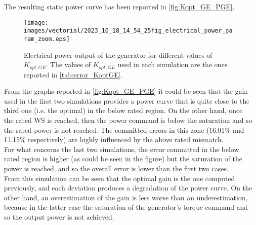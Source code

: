 The resulting static power curve has been reported in \autoref{fig:Kopt_GE_PGE}.
\begin{figure}
  \centering
  \texttt{[image: images/vectorial/2023\_10\_18\_14\_54\_25fig\_electrical\_power\_param\_zoom.eps]}
  \caption{Electrical power output of the generator for different values of $K_{opt,GE}$. The values of $K_{opt,GE}$ used in each simulation are the ones reported in \autoref{tab:error_KoptGE}.}
  \label{fig:Kopt_GE_PGE}
\end{figure}

From the graphs reported in \autoref{fig:Kopt_GE_PGE} it could be seen that the gain used in the first two simulations provides a power curve that is quite close to the third one (i.e. the optimal) in the below rated region. On the other hand, once the rated WS is reached, then the power command is below the saturation and so the rated power is not reached. The committed errors in this zone (16.01\% and 11.15\% respectively) are highly influenced by the above rated mismatch. \\
For what concerns the last two simulations, the error committed in the below rated region is higher (as could be seen in the figure) but the saturation of the power is reached, and so the overall error is lower than the first two cases. \\
From this simulation can be seen that the optimal gain is the one computed previously, and each deviation produces a degradation of the power curve. On the other hand, an overestimation of the gain is less worse than an underestimation, because in the latter case the saturation of the generator's torque command and so the output power is not achieved.

